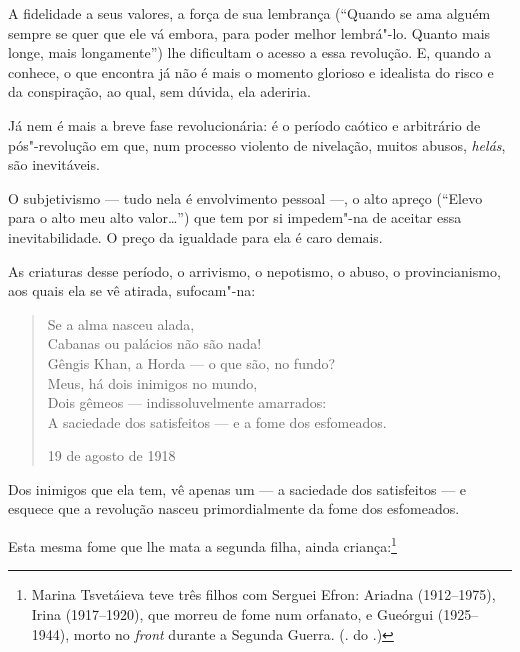 A fidelidade a seus valores, a força de sua lembrança (``Quando se
ama alguém sempre se quer que ele vá embora, para poder melhor
lembrá"-lo. Quanto mais longe, mais longamente'') lhe dificultam
o acesso a essa revolução. E, quando a conhece, o que encontra já
não é mais o momento glorioso e idealista do risco e da conspiração,
ao qual, sem dúvida, ela aderiria.

Já nem é mais a breve fase revolucionária: é o período caótico e
arbitrário de pós"-revolução em que, num processo violento de nivelação,
muitos abusos, \emph{helás}, são inevitáveis.

O subjetivismo --- tudo nela é envolvimento pessoal ---, o alto apreço
(``Elevo para o alto meu alto valor\ldots{}'')
que tem por si impedem"-na de aceitar essa inevitabilidade. O preço da igualdade
para ela é caro demais.

As criaturas desse período, o arrivismo, o nepotismo, o abuso, o
provincianismo, aos quais ela se vê atirada, sufocam"-na:

\begin{verse}
Se a alma nasceu alada, \\
Cabanas ou palácios não são nada! \\
Gêngis Khan, a Horda --- o que são, no fundo? \\[8pt]
\pagebreak
Meus, há dois inimigos no mundo, \\
Dois gêmeos --- indissoluvelmente amarrados: \\
A saciedade dos satisfeitos --- e a fome \qb{}dos esfomeados. 

19 de agosto de 1918

\end{verse}

Dos inimigos que ela tem, vê apenas um --- a saciedade dos
satisfeitos --- e esquece que a revolução nasceu primordialmente
da fome dos esfomeados.

Esta mesma fome que lhe mata a segunda filha, ainda
criança:\footnote{Marina Tsvetáieva teve três filhos com
Serguei Efron: Ariadna (1912--1975), Irina (1917--1920), que
morreu de fome num orfanato, e Gueórgui (1925--1944), morto
no \emph{front} durante a Segunda Guerra. (. do
.)}

